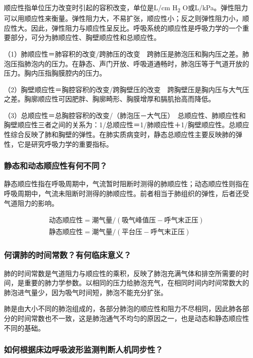 顺应性指单位压力改变时引起的容积改变，单位是L/cm H\textsubscript{2}
O或L/kPa。弹性阻力可以用顺应性来衡量。弹性阻力大，不易扩张，顺应性小；反之则弹性阻力小，顺应性大。因此，弹性阻力与顺应性呈反比。呼吸系统的顺应性是呼吸力学的一个重要部分，可分为肺顺应性、胸壁顺应性和总顺应性。

（1）肺顺应性＝肺容积的改变/跨肺压的改变　跨肺压是肺泡压和胸内压之差。肺泡压指肺泡内的压力。在静态、声门开放、呼吸道通畅时，肺泡压等于气道开放的压力。胸内压指胸膜腔内的压力。

（2）胸壁顺应性＝胸腔容积的改变/跨胸壁压的改变　跨胸壁压是胸内压与大气压之差。胸廓顺应性可因肥胖、胸廓畸形、胸膜增厚和膈肌抬高而降低。

（3）总顺应性＝总胸腔容积的改变/（肺泡压－大气压）　总顺应性、肺顺应性和胸壁顺应性三者之间的关系为：1/总顺应性＝1/肺顺应性＋1/胸壁顺应性。总顺应性综合反映了肺和胸壁的弹性。在肺实质病变时，静态总顺应性主要反映肺的弹性，它是研究呼吸力学的重要指标。

\subsubsection{静态和动态顺应性有何不同？}

静态顺应性指在呼吸周期中，气流暂时阻断时测得的肺顺应性；动态顺应性则指在呼吸周期中，气流未阻断时测得的肺顺应性。前者相当于肺组织的弹性，后者还受气道阻力的影响。

\[
\begin{array}{l}
    \text{动态顺应性}=\text{潮气量}/(\text{吸气峰值压}-\text{呼气末正压})\\
    \text{静态顺应性}=\text{潮气量}/(\text{平台压}-\text{呼气末正压})
\end{array}    
\]

\subsubsection{何谓肺的时间常数？有何临床意义？}

肺的时间常数是气道阻力与顺应性的乘积，反映了肺泡充满气体和排空所需要的时间，是重要的肺力学参数。以相同的压力给肺泡充气，在相同时间内时间常数大的肺泡进气量少，因为吸气时间短，肺泡不能充分扩张。

肺是由大小不同的肺泡组成的，各部分肺泡的顺应性和阻力不尽相同，因此肺各部分的时间常数也不一致，这是肺泡通气不均匀的原因之一，也是动态和静态顺应性不同的基础。

\subsubsection{如何根据床边呼吸波形监测判断人机同步性？}

